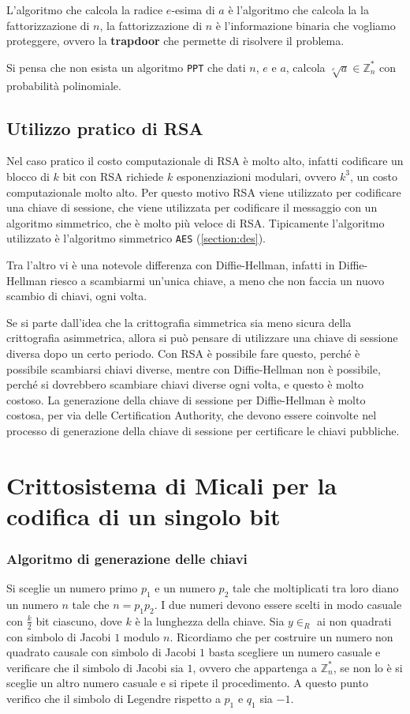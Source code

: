 L'algoritmo che calcola la radice $e$-esima di $a$ è l'algoritmo che calcola la
la fattorizzazione di $n$, la fattorizzazione di $n$ è l'informazione 
binaria che vogliamo proteggere, ovvero la \textbf{trapdoor} che permette di risolvere 
il problema.
\begin{tcolorbox}[title=Fattorizzazione di $n$]
  Si pensa che non esista un algoritmo \texttt{PPT} che dati $n$, $e$ e $a$,
  calcola $\sqrt[e]{a} \in \mathbb{Z}_n^*$ con probabilità polinomiale.
\end{tcolorbox}
\subsection{Utilizzo pratico di RSA}
Nel caso pratico il costo computazionale di RSA è molto alto, infatti codificare 
un blocco di $k$ bit con RSA richiede $k$ esponenziazioni modulari, ovvero $k^3$, 
un costo computazionale molto alto. Per questo motivo RSA viene utilizzato per
codificare una chiave di sessione, che viene utilizzata per codificare
il messaggio con un algoritmo simmetrico, che è molto più veloce di RSA.
Tipicamente l'algoritmo utilizzato è l'algoritmo simmetrico \texttt{AES} (\ref{section:des}).

Tra l'altro vi è una notevole differenza con Diffie-Hellman, infatti in Diffie-Hellman
riesco a scambiarmi un'unica chiave, a meno che non faccia un nuovo scambio di chiavi,
ogni volta.

Se si parte dall'idea che la crittografia simmetrica sia meno sicura della crittografia
asimmetrica, allora si può pensare di utilizzare una chiave di sessione diversa dopo 
un certo periodo. Con RSA è possibile fare questo, perché è possibile scambiarsi
chiavi diverse, mentre con Diffie-Hellman non è possibile, perché si dovrebbero scambiare
chiavi diverse ogni volta, e questo è molto costoso. La generazione della chiave di sessione 
per Diffie-Hellman è molto costosa, per via delle Certification Authority, che devono
essere coinvolte nel processo di generazione della chiave di sessione per certificare 
le chiavi pubbliche.
\section{Crittosistema di Micali per la codifica di un singolo bit}
\subsubsection{Algoritmo di generazione delle chiavi}
Si sceglie un numero primo $p_1$ e un numero $p_2$ tale che moltiplicati tra loro
diano un numero $n$ tale che $n = p_1p_2$. I due numeri devono essere scelti in modo
casuale con $\frac{k}{2}$ bit ciascuno, dove $k$ è la lunghezza della chiave. Sia 
$y \in_R$ ai non quadrati con simbolo di Jacobi $1$ modulo $n$. Ricordiamo che per 
costruire un numero non quadrato causale con simbolo di Jacobi $1$ basta scegliere un numero
casuale e verificare che il simbolo di Jacobi sia $1$, ovvero che appartenga 
a $\mathbb{Z}_n^*$, se non lo è si sceglie un altro
numero casuale e si ripete il procedimento. A questo punto verifico che il simbolo 
di Legendre rispetto a $p_1$ e $q_1$ sia $-1$. 

